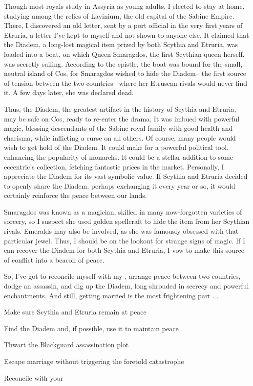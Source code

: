 \documentclass[char]{Kos}
\begin{document}
Though most royals study in Assyria as young adults, I elected to stay at home, studying among the relics of Lavinium, the old capital of the Sabine Empire. There, I discovered an old letter, sent by a port official in the very first years of Etruria, a letter I've kept to myself and not shown to anyone else. It claimed that the Diadem, a long-lost magical item prized by both Scythia and Etruria, was loaded into a boat, on which Queen Smaragdos, the first Scythian queen herself, was secretly sailing. According to the epistle, the boat was bound for the small, neutral island of Cos, for Smaragdos wished to hide the Diadem-- the first source of tension between the two countries-- where her Etruscan rivals would never find it. A few days later, she was declared dead.

Thus, the Diadem, the greatest artifact in the history of Scythia and Etruria, may be safe on Cos, ready to re-enter the drama. It was imbued with powerful magic, blessing descendants of the Sabine royal family with good health and charisma, while inflicting a curse on all others. Of course, many people would wish to get hold of the Diadem. It could make for a powerful political tool, enhancing the popularity of monarchs. It could be a stellar addition to some eccentric's collection, fetching fantastic prices in the market. Personally, I appreciate the Diadem for its vast symbolic value. If Scythia and Etruria decided to openly share the Diadem, perhaps exchanging it every year or so, it would certainly reinforce the peace between our lands.

Smaragdos was known as a magician, skilled in many now-forgotten varieties of sorcery, so I suspect she used golden spellcraft to hide the item from her Scythian rivals. Emeralds may also be involved, as she was famously obsessed with that particular jewel. Thus, I should be on the lookout for strange signs of magic. If I can recover the Diadem for both Scythia and Etruria, I vow to make this source of conflict into a beacon of peace. 

So, I've got to reconcile myself with my \cPoet{\sibling}, arrange peace between two countries, dodge an assassin, and dig up the Diadem, long shrouded in secrecy and powerful enchantments. And still, getting married is the most frightening part . . .

\begin{itemz}[Goals]
 \item Make sure Scythia and Etruria remain at peace
 \item Find the Diadem and, if possible, use it to maintain peace
 \item Thwart the Blackguard assassination plot 
 \item Escape marriage without triggering the foretold catastrophe
 \item Reconcile with your \cPoet{\sibling}
\end{itemz}
\end{document}
